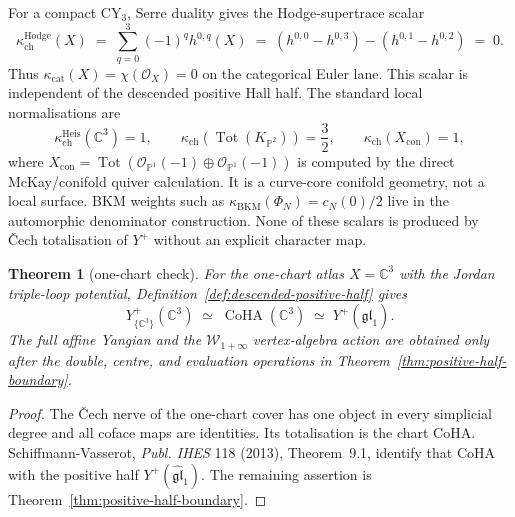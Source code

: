 \documentclass[11pt]{article}
\providecommand{\CC}{\mathbb{C}}
\providecommand{\cO}{\mathcal{O}}
\providecommand{\CoHA}{\operatorname{CoHA}}
\providecommand{\Tot}{\operatorname{Tot}}
\newtheorem{theorem}{Theorem}[section]
\theoremstyle{definition}
\theoremstyle{remark}
\begin{document}
For a compact CY$_3$, Serre duality gives the Hodge-supertrace scalar
\[
\kappa_{\mathrm{ch}}^{\mathrm{Hodge}}(X)
\;=\;
\sum_{q=0}^{3}(-1)^q h^{0,q}(X)
\;=\;(h^{0,0}-h^{0,3})-(h^{0,1}-h^{0,2})
\;=\;0.
\]
Thus $\kappa_{\mathrm{cat}}(X)=\chi(\cO_X)=0$ on the categorical Euler
lane. This scalar is independent of the descended positive Hall half.
The standard local normalisations are
\[
\kappa_{\mathrm{ch}}^{\mathrm{Heis}}(\CC^3)=1,\qquad
\kappa_{\mathrm{ch}}\!\left(\Tot(K_{\mathbb{P}^2})\right)=\frac32,\qquad
\kappa_{\mathrm{ch}}(X_{\mathrm{con}})=1,
\]
where
$X_{\mathrm{con}}=\Tot(\mathcal O_{\mathbb{P}^1}(-1)\oplus
\mathcal O_{\mathbb{P}^1}(-1))$ is computed by the direct
McKay/conifold quiver calculation. It is a curve-core conifold geometry,
not a local surface. BKM weights such as
$\kappa_{\mathrm{BKM}}(\Phi_N)=c_N(0)/2$ live in the automorphic
denominator construction. None of these scalars is produced by
\v{C}ech totalisation of $Y^+$ without an explicit character map.

\begin{theorem}[one-chart check]\label{thm:one-chart-check}
For the one-chart atlas $X=\CC^3$ with the Jordan triple-loop potential,
Definition~\ref{def:descended-positive-half} gives
\[
Y^+_{\{\CC^3\}}(\CC^3)
\;\simeq\;
\CoHA(\CC^3)
\;\simeq\;
Y^+(\widehat{\mathfrak{gl}}_1).
\]
The full affine Yangian and the $\mathcal W_{1+\infty}$ vertex-algebra
action are obtained only after the double, centre, and evaluation
operations in Theorem~\ref{thm:positive-half-boundary}.
\end{theorem}

\begin{proof}
The \v{C}ech nerve of the one-chart cover has one object in every
simplicial degree and all coface maps are identities. Its totalisation
is the chart CoHA. Schiffmann-Vasserot, \emph{Publ. IHES} 118 (2013),
Theorem~9.1, identify that CoHA with the positive half
$Y^+(\widehat{\mathfrak{gl}}_1)$. The remaining assertion is
Theorem~\ref{thm:positive-half-boundary}.
\end{proof}
\end{document}
